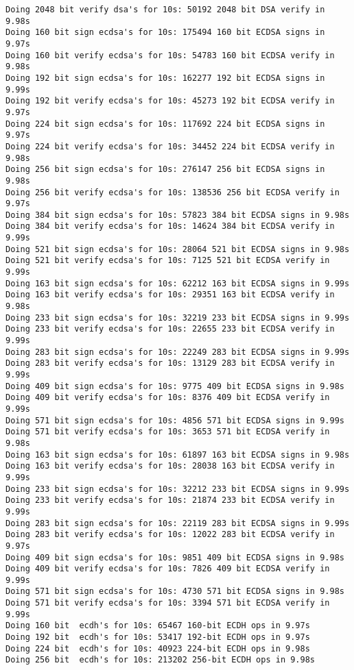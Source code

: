 \documentclass[%
 aip,
 jmp,%
 amsmath,amssymb,
 reprint,%
]{revtex4-1}
\begin{document}
\begin{verbatim}
Doing 2048 bit verify dsa's for 10s: 50192 2048 bit DSA verify in 9.98s
Doing 160 bit sign ecdsa's for 10s: 175494 160 bit ECDSA signs in 9.97s 
Doing 160 bit verify ecdsa's for 10s: 54783 160 bit ECDSA verify in 9.98s
Doing 192 bit sign ecdsa's for 10s: 162277 192 bit ECDSA signs in 9.99s 
Doing 192 bit verify ecdsa's for 10s: 45273 192 bit ECDSA verify in 9.97s
Doing 224 bit sign ecdsa's for 10s: 117692 224 bit ECDSA signs in 9.97s 
Doing 224 bit verify ecdsa's for 10s: 34452 224 bit ECDSA verify in 9.98s
Doing 256 bit sign ecdsa's for 10s: 276147 256 bit ECDSA signs in 9.98s 
Doing 256 bit verify ecdsa's for 10s: 138536 256 bit ECDSA verify in 9.97s
Doing 384 bit sign ecdsa's for 10s: 57823 384 bit ECDSA signs in 9.98s 
Doing 384 bit verify ecdsa's for 10s: 14624 384 bit ECDSA verify in 9.99s
Doing 521 bit sign ecdsa's for 10s: 28064 521 bit ECDSA signs in 9.98s 
Doing 521 bit verify ecdsa's for 10s: 7125 521 bit ECDSA verify in 9.99s
Doing 163 bit sign ecdsa's for 10s: 62212 163 bit ECDSA signs in 9.99s 
Doing 163 bit verify ecdsa's for 10s: 29351 163 bit ECDSA verify in 9.98s
Doing 233 bit sign ecdsa's for 10s: 32219 233 bit ECDSA signs in 9.99s 
Doing 233 bit verify ecdsa's for 10s: 22655 233 bit ECDSA verify in 9.99s
Doing 283 bit sign ecdsa's for 10s: 22249 283 bit ECDSA signs in 9.99s 
Doing 283 bit verify ecdsa's for 10s: 13129 283 bit ECDSA verify in 9.99s
Doing 409 bit sign ecdsa's for 10s: 9775 409 bit ECDSA signs in 9.98s 
Doing 409 bit verify ecdsa's for 10s: 8376 409 bit ECDSA verify in 9.99s
Doing 571 bit sign ecdsa's for 10s: 4856 571 bit ECDSA signs in 9.99s 
Doing 571 bit verify ecdsa's for 10s: 3653 571 bit ECDSA verify in 9.98s
Doing 163 bit sign ecdsa's for 10s: 61897 163 bit ECDSA signs in 9.98s 
Doing 163 bit verify ecdsa's for 10s: 28038 163 bit ECDSA verify in 9.99s
Doing 233 bit sign ecdsa's for 10s: 32212 233 bit ECDSA signs in 9.99s 
Doing 233 bit verify ecdsa's for 10s: 21874 233 bit ECDSA verify in 9.99s
Doing 283 bit sign ecdsa's for 10s: 22119 283 bit ECDSA signs in 9.99s 
Doing 283 bit verify ecdsa's for 10s: 12022 283 bit ECDSA verify in 9.97s
Doing 409 bit sign ecdsa's for 10s: 9851 409 bit ECDSA signs in 9.98s 
Doing 409 bit verify ecdsa's for 10s: 7826 409 bit ECDSA verify in 9.99s
Doing 571 bit sign ecdsa's for 10s: 4730 571 bit ECDSA signs in 9.98s 
Doing 571 bit verify ecdsa's for 10s: 3394 571 bit ECDSA verify in 9.99s
Doing 160 bit  ecdh's for 10s: 65467 160-bit ECDH ops in 9.97s
Doing 192 bit  ecdh's for 10s: 53417 192-bit ECDH ops in 9.97s
Doing 224 bit  ecdh's for 10s: 40923 224-bit ECDH ops in 9.98s
Doing 256 bit  ecdh's for 10s: 213202 256-bit ECDH ops in 9.98s

\end{verbatim}
\end{document}
